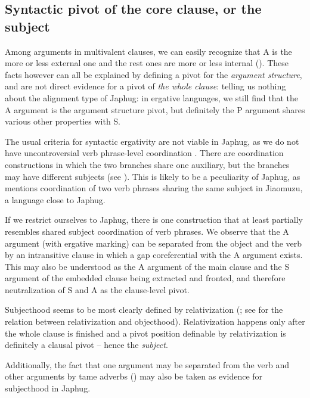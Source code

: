 \documentclass[a4paper, oneside, 12pt]{report}
\newcommand*{\citepage}[1]{p.~{#1}}
\newcommand*{\term}[1]{\emph{#1}}
\begin{document}
\subsection{Syntactic pivot of the core clause, or the subject}\label{sec:grammatical.clause.subject}

Among arguments in multivalent clauses, we can easily recognize that 
A is the more or less external one
and the rest ones are more or less internal
().
These facts however can all be explained by defining a pivot for the \emph{argument structure},
and are not direct evidence for a pivot of \emph{the whole clause}:
telling us nothing about the alignment type of Japhug:
in ergative languages, we still find that the A argument is the argument structure pivot,
but definitely the P argument shares various other properties with S.

The usual criteria for syntactic ergativity are not viable in Japhug,
as we do not have uncontroversial verb phrase-level coordination \citep{jacques2014clause}.
There are coordination constructions in which the two branches share one auxiliary,
but the branches may have different subjects
(see ).
This is likely to be a peculiarity of Japhug,
as \citet[\citepage{549}]{prins2011web} mentions 
coordination of two verb phrases sharing the same subject
in Jiaomuzu, a language close to Japhug.

If we restrict ourselves to Japhug,
there is one construction that at least partially resembles
shared subject coordination of verb phrases.
We observe that the A argument (with ergative marking) 
can be separated from the object and the verb 
by an intransitive clause \citep[\citepage{306}]{jacques2021grammar}
in which a gap coreferential with the A argument exists.
This may also be understood 
as the A argument of the main clause and the S argument of the embedded clause
being extracted and fronted,
and therefore neutralization of S and A as the clause-level pivot.

Subjecthood seems to be most clearly defined by relativization
(\citealt{jacques2016subjects};
see  for the relation 
between relativization and objecthood).
Relativization happens only after the whole clause is finished
and a pivot position definable by relativization is definitely a clausal pivot
-- hence the \term{subject}.

Additionally, the fact that one argument may be separated from
the verb and other arguments by \ac{tame} adverbs
()
may also be taken as evidence for subjecthood in Japhug.
\end{document}
